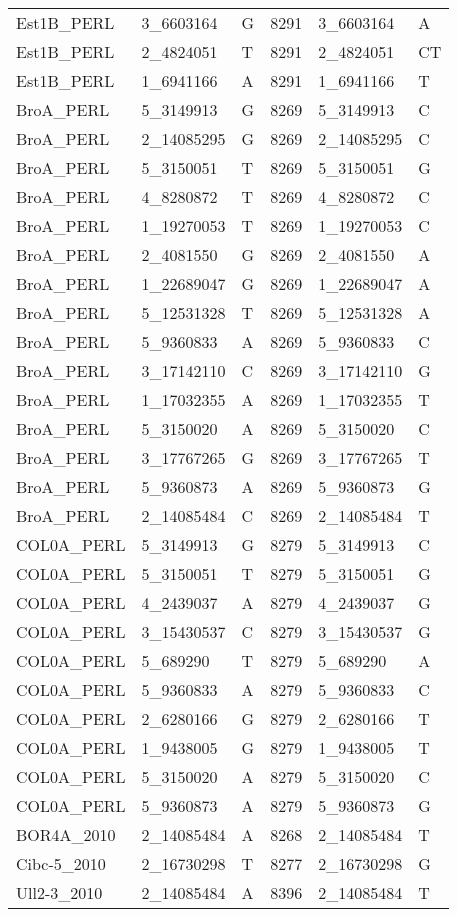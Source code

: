 \begin{center}
\begin{longtable}{|l|l|l|l|l|l|}
Est1B\_PERL&3\_6603164&G&8291&3\_6603164&A\\
Est1B\_PERL&2\_4824051&T&8291&2\_4824051&CT\\
Est1B\_PERL&1\_6941166&A&8291&1\_6941166&T\\
BroA\_PERL&5\_3149913&G&8269&5\_3149913&C\\
BroA\_PERL&2\_14085295&G&8269&2\_14085295&C\\
BroA\_PERL&5\_3150051&T&8269&5\_3150051&G\\
BroA\_PERL&4\_8280872&T&8269&4\_8280872&C\\
BroA\_PERL&1\_19270053&T&8269&1\_19270053&C\\
BroA\_PERL&2\_4081550&G&8269&2\_4081550&A\\
BroA\_PERL&1\_22689047&G&8269&1\_22689047&A\\
BroA\_PERL&5\_12531328&T&8269&5\_12531328&A\\
BroA\_PERL&5\_9360833&A&8269&5\_9360833&C\\
BroA\_PERL&3\_17142110&C&8269&3\_17142110&G\\
BroA\_PERL&1\_17032355&A&8269&1\_17032355&T\\
BroA\_PERL&5\_3150020&A&8269&5\_3150020&C\\
BroA\_PERL&3\_17767265&G&8269&3\_17767265&T\\
BroA\_PERL&5\_9360873&A&8269&5\_9360873&G\\
BroA\_PERL&2\_14085484&C&8269&2\_14085484&T\\
COL0A\_PERL&5\_3149913&G&8279&5\_3149913&C\\
COL0A\_PERL&5\_3150051&T&8279&5\_3150051&G\\
COL0A\_PERL&4\_2439037&A&8279&4\_2439037&G\\
COL0A\_PERL&3\_15430537&C&8279&3\_15430537&G\\
COL0A\_PERL&5\_689290&T&8279&5\_689290&A\\
COL0A\_PERL&5\_9360833&A&8279&5\_9360833&C\\
COL0A\_PERL&2\_6280166&G&8279&2\_6280166&T\\
COL0A\_PERL&1\_9438005&G&8279&1\_9438005&T\\
COL0A\_PERL&5\_3150020&A&8279&5\_3150020&C\\
COL0A\_PERL&5\_9360873&A&8279&5\_9360873&G\\
BOR4A\_2010&2\_14085484&A&8268&2\_14085484&T\\
Cibc-5\_2010&2\_16730298&T&8277&2\_16730298&G\\
Ull2-3\_2010&2\_14085484&A&8396&2\_14085484&T\\

\end{longtable}
\end{center}
